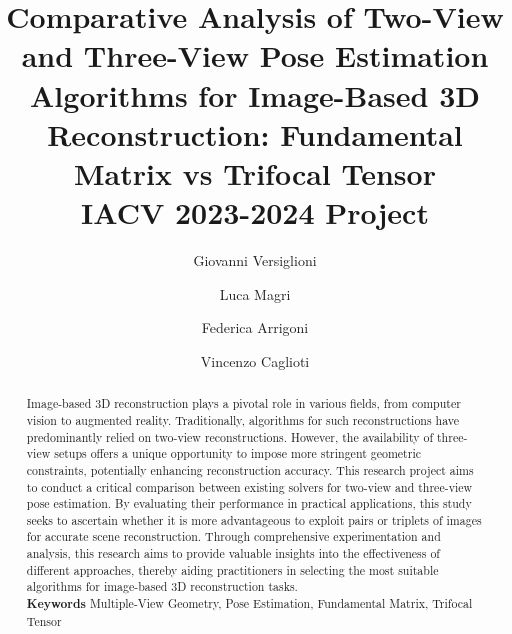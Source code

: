 \documentclass[11pt,letterpaper]{article}
\numberwithin{equation}{section}
\begin{document}
\title{Comparative Analysis of Two-View and Three-View Pose Estimation Algorithms for Image-Based 3D Reconstruction: Fundamental Matrix vs Trifocal Tensor \\ IACV 2023-2024 Project}

\author[1]{Giovanni Versiglioni}
\author[2]{Luca Magri}
\author[2]{Federica Arrigoni}
\author[2]{Vincenzo Caglioti}

\maketitle

\begin{abstract}
	Image-based 3D reconstruction plays a pivotal role in various fields, from computer vision to augmented reality. Traditionally, algorithms for such reconstructions have predominantly relied on two-view reconstructions. However, the availability of three-view setups offers a unique opportunity to impose more stringent geometric constraints, potentially enhancing reconstruction accuracy. This research project aims to conduct a critical comparison between existing solvers for two-view and three-view pose estimation. By evaluating their performance in practical applications, this study seeks to ascertain whether it is more advantageous to exploit pairs or triplets of images for accurate scene reconstruction. Through comprehensive experimentation and analysis, this research aims to provide valuable insights into the effectiveness of different approaches, thereby aiding practitioners in selecting the most suitable algorithms for image-based 3D reconstruction tasks.\\
	
	\textbf{Keywords} Multiple-View Geometry, Pose Estimation, Fundamental Matrix, Trifocal Tensor
\end{abstract}

\begin{multicols}{2}
\tableofcontents
\end{multicols}

\pagebreak









{\small


}

\pagebreak

\listoffigures
\listoftables
\end{document}
